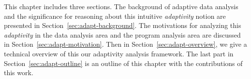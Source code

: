 This chapter includes three sections.
The background of adaptive data analysis and the
significance for reasoning about this intuitive \emph{adaptivity} notion 
are presented in Section~\ref{sec:adapt-background}.
The motivations for analyzing this \emph{adaptivity}
in the data analysis area
and the program analysis area are discussed
in Section~\ref{sec:adapt-motivation}.
Then in Section~\ref{sec:adapt-overview},
we give a technical overview of this our adaptivity analysis framework.
The last part in Section~\ref{sec:adapt-outline} is an outline of this chapter with the contributions of this work.



